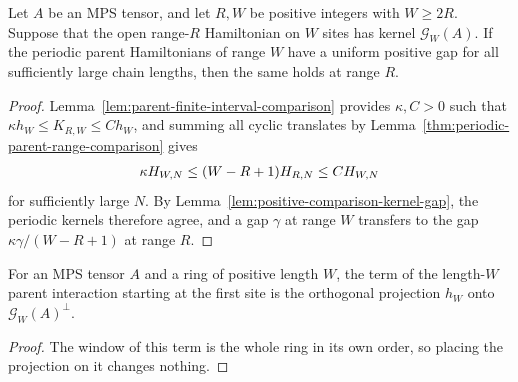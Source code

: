 \begin{lemma}
    \label{thm:parent-gap-fixed-range-transfer}
    \leanok
    Let $A$ be an MPS tensor, and let $R,W$ be positive integers with
    $W\geq2R$. Suppose that the open range-$R$ Hamiltonian on $W$
    sites has kernel $\mathcal G_W(A)$. If the periodic parent Hamiltonians
    of range $W$ have a uniform positive gap for all sufficiently large
    chain lengths, then the same holds at range $R$.
\end{lemma}
\begin{proof}
    \leanok
    Lemma~\ref{lem:parent-finite-interval-comparison} provides
    $\kappa,C>0$ such that
    $\kappa h_W\leq K_{R,W}\leq Ch_W$, and summing all cyclic translates by
    Lemma~\ref{thm:periodic-parent-range-comparison} gives
    \begin{align}
        \kappa H_{W,N}\leq (W-R+1)H_{R,N}\leq C H_{W,N}
        \notag
    \end{align}
    for sufficiently large $N$. By
    Lemma~\ref{lem:positive-comparison-kernel-gap}, the periodic kernels
    therefore agree, and a gap $\gamma$ at range $W$ transfers to the gap
    $\kappa\gamma/(W-R+1)$ at range $R$.
\end{proof}

\begin{lemma}
    \label{lem:full-interval-parent-interaction}
    \leanok
    For an MPS tensor $A$ and a ring of positive length $W$, the term of
    the length-$W$ parent interaction starting at the first site is the
    orthogonal projection $h_W$ onto $\mathcal G_W(A)^\perp$.
\end{lemma}
\begin{proof}\leanok
    The window of this term is the whole ring in its own order, so placing
    the projection on it changes nothing.
\end{proof}

